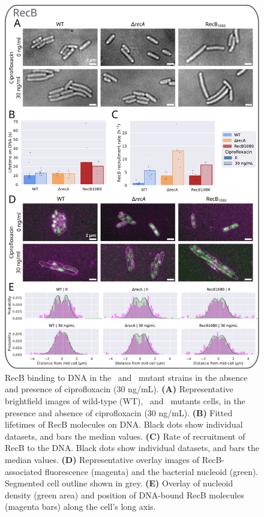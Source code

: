 \begin{figure}[htbp]
    \centering
    \includegraphics[width=.75\textwidth]{Figures/Fig4_mutants.pdf}
    \caption{RecB binding to DNA in the \dreca\ and \teneighty\ mutant strains in the absence and presence of ciprofloxacin (30 ng/mL). \textbf{(A)} Representative brightfield images of wild-type (WT), \dreca\ and \teneighty\ mutants cells, in the presence and absence of ciprofloxacin (30 ng/mL). \textbf{(B)} Fitted lifetimes of RecB molecules on DNA. Black dots show individual datasets, and bars the median values. \textbf{(C)} Rate of recruitment of RecB to the DNA. Black dots show individual datasets, and bars the median values. \textbf{(D)} Representative overlay images of RecB-associated fluorescence (magenta) and the bacterial nucleoid (green). Segmented cell outline shown in grey. \textbf{(E)} Overlay of nucleoid density (green area) and position of DNA-bound RecB molecules (magenta bars) along the cell's long axis.}
    \label{Fig:mutants}
\end{figure}

